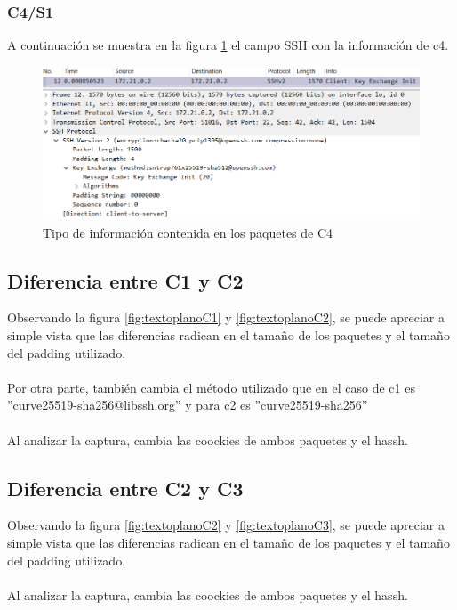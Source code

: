 \documentclass[letter,12pt]{article}
\begin{document}
\subsubsection{C4/S1}

A continuación se muestra en la figura \ref{fig:textoplanoC4} el campo SSH con la información de c4.

\begin{figure}[ht]
    \centering
    \includegraphics[width=1\linewidth]{Images/parte1/textoplano/textoplanoC4.png}
    \caption{Tipo de información contenida en los paquetes de C4}
    \label{fig:textoplanoC4}
\end{figure}


\subsection{Diferencia entre C1 y C2}

Observando la figura \ref{fig:textoplanoC1} y \ref{fig:textoplanoC2}, se puede apreciar a simple vista que las diferencias radican en el tamaño de los paquetes y el tamaño del padding utilizado.\\
\\
Por otra parte, también cambia el método utilizado que en el caso de c1 es ''curve25519-sha256@libssh.org'' y para c2 es ''curve25519-sha256''\\
\\
Al analizar la captura, cambia las coockies de ambos paquetes y el hassh.

\subsection{Diferencia entre C2 y C3}

Observando la figura \ref{fig:textoplanoC2} y \ref{fig:textoplanoC3}, se puede apreciar a simple vista que las diferencias radican en el tamaño de los paquetes y el tamaño del padding utilizado.\\
\\
Al analizar la captura, cambia las coockies de ambos paquetes y el hassh.
\end{document}
